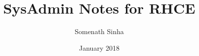 

\title{SysAdmin Notes for RHCE}
\author{Somenath Sinha}
\date{January 2018}


	\maketitle
	\newpage
	\tableofcontents

	
	
	
	
	
